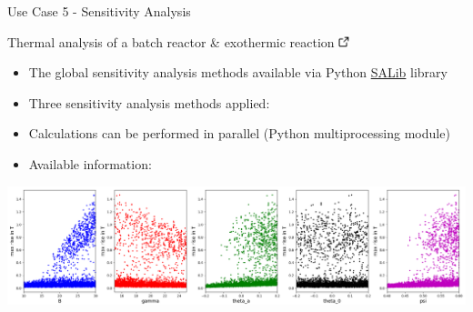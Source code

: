 \documentclass[compress,newPxFont,sthlmFooter]{beamer}
\begin{document}
\begin{frame}[plain]{Use Case 5 - Sensitivity Analysis}
    \begin{center}
        \alert{Thermal analysis of a batch reactor \& exothermic reaction} \href{http://daetools.com/docs/tutorials-sa.html\#tutorial_sa_3}{\includegraphics[align=b, height=0.8em]{link.png}}
    \end{center}   
    {\scriptsize
    \begin{itemize}
      \item The global sensitivity analysis methods available via Python \alert{\href{http://salib.readthedocs.io}{SALib}} library
      \item Three sensitivity analysis methods applied:
      \item \alert{Calculations can be performed in parallel} (Python \alert{multiprocessing} module)
      \item Available information:
    \end{itemize}
    }    
    \begin{center}
        \includegraphics[align=c, width=\textwidth]{sa_scatter_sobol.png}
    \end{center}
    
\end{frame}
\end{document}
